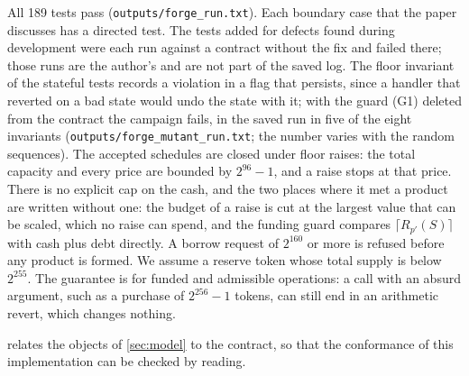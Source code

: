 All 189 tests pass (\texttt{outputs/forge\_run.txt}). Each boundary case that the paper discusses has a directed test. The tests added for defects found during development were each run against a contract without the fix and failed there; those runs are the author's and are not part of the saved log. The floor invariant of the stateful tests records a violation in a flag that persists, since a handler that reverted on a bad state would undo the state with it; with the guard (G1) deleted from the contract the campaign fails, in the saved run in five of the eight invariants (\texttt{outputs/forge\_mutant\_run.txt}; the number varies with the random sequences). The accepted schedules are closed under floor raises: the total capacity and every price are bounded by $2^{96}-1$, and a raise stops at that price. There is no explicit cap on the cash, and the two places where it met a product are written without one: the budget of a raise is cut at the largest value that can be scaled, which no raise can spend, and the funding guard compares $\lceil R_{p'}(S)\rceil$ with cash plus debt directly. A borrow request of $2^{160}$ or more is refused before any product is formed. We assume a reserve token whose total supply is below $2^{255}$. The guarantee is for funded and admissible operations: a call with an absurd argument, such as a purchase of $2^{256}-1$ tokens, can still end in an arithmetic revert, which changes nothing.

 relates the objects of \cref{sec:model} to the contract, so that the conformance of this implementation can be checked by reading.

